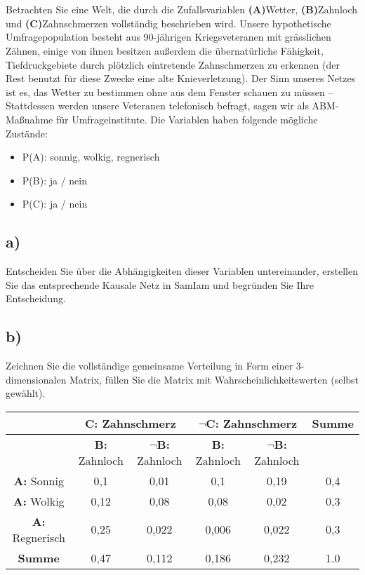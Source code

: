 \documentclass[12pt, a4paper]{article}
\begin{document}
\maketitle
\newpage
\section{}
Betrachten Sie eine Welt, die durch die Zufallsvariablen \textbf{(A)}Wetter, \textbf{(B)}Zahnloch und \textbf{(C)}Zahnschmerzen vollständig beschrieben wird. Unsere hypothetische Umfragepopulation besteht aus 90-jährigen Kriegsveteranen mit grässlichen Zähnen, einige von ihnen besitzen außerdem die übernatürliche Fähigkeit, Tiefdruckgebiete durch plötzlich eintretende Zahnschmerzen zu erkennen (der Rest benutzt für diese Zwecke eine alte Knieverletzung). Der Sinn unseres Netzes ist es, das Wetter zu bestimmen ohne aus dem Fenster schauen zu müssen – Stattdessen werden unsere Veteranen telefonisch befragt, sagen wir als ABM-Maßnahme für Umfrageinstitute.
Die Variablen haben folgende mögliche Zustände:
\begin{itemize}
\item P(A): sonnig, wolkig, regnerisch
\item P(B): ja / nein
\item P(C): ja / nein
\end{itemize}


\subsection*{a)}
Entscheiden Sie über die Abhängigkeiten dieser Variablen untereinander, erstellen Sie das entsprechende Kausale Netz in SamIam und begründen Sie Ihre Entscheidung.\\


\subsection*{b)}
Zeichnen Sie die vollständige gemeinsame Verteilung in Form einer 3-dimensionalen Matrix, füllen Sie die Matrix mit Wahrscheinlichkeitswerten (selbst gewählt).
\\

\begin{tabular}[bct]{|c|c|c|c|c|c|}
\hline \bigstrut
& \multicolumn{2}{|c|}{\textbf{C:} Zahnschmerz } & \multicolumn{2}{|c|}{\textbf{$\neg$C}: Zahnschmerz } & \textbf{Summe} \\
\hline \bigstrut
& \textbf{B:} Zahnloch & \textbf{$\neg$B:} Zahnloch & \textbf{B:} Zahnloch & \textbf{$\neg$B:} Zahnloch & \\
\hline \bigstrut
\textbf{A:} Sonnig & 0,1 & 0,01 & 0,1 & 0,19 & 0,4 \\ 
\hline \bigstrut
\textbf{A:} Wolkig & 0,12 & 0,08 & 0,08 & 0,02 & 0,3 \\ 
\hline \bigstrut
\textbf{A:} Regnerisch & 0,25 & 0,022 & 0,006 & 0,022 & 0,3 \\ 
\hline \bigstrut
\textbf{Summe} & 0,47 & 0,112 & 0,186 & 0,232 & 1.0 \\ 
\hline
\end{tabular}
\end{document}
